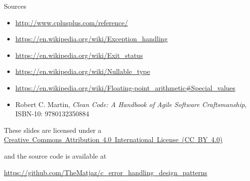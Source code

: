 \documentclass[aspectratio=169,14pt]{beamer}
\begin{document}
\begin{frame}{Sources}
\begin{small}
    \begin{itemize}
        \item \url{http://www.cplusplus.com/reference/}
        \item \url{https://en.wikipedia.org/wiki/Exception_handling}
        \item \url{https://en.wikipedia.org/wiki/Exit_status}
        \item \url{https://en.wikipedia.org/wiki/Nullable_type}
        \item \url{https://en.wikipedia.org/wiki/Floating-point_arithmetic\#Special_values}
        \item Robert C. Martin, \textit{Clean Code: A Handbook of Agile Software Craftsmanship}, ISBN-10: 9780132350884 
    \end{itemize}
\end{small}
    
\begin{footnotesize}
    \begin{center}
        These slides are licensed under a \href{https://creativecommons.org/licenses/by/4.0/}{Creative~Commons~Attribution~4.0~International~License~(CC~BY~4.0)}
        
        and the source code is available at
        
        \url{https://github.com/TheMatjaz/c_error_handling_design_patterns}
    \end{center}    
\end{footnotesize}
\end{frame}
\end{document}

